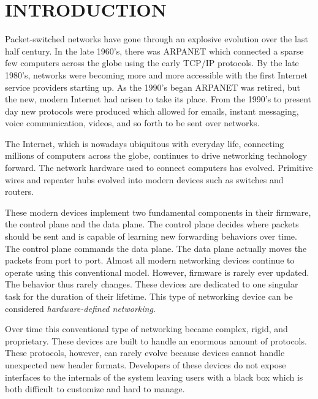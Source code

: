 \chapter{INTRODUCTION} \label{ch:intro}

%
%




Packet-switched networks have gone through an explosive evolution over the last half century. In the late 1960's, there was ARPANET which connected a sparse few computers across the globe using the early TCP/IP protocols. By the late 1980's, networks were becoming more and more accessible with the first Internet service providers starting up. As the 1990's began ARPANET was retired, but the new, modern Internet had arisen to take its place. From the 1990's to present day new protocols were produced which allowed for emails, instant messaging, voice communication, videos, and so forth to be sent over networks. 

The Internet, which is nowadays ubiquitous with everyday life, connecting millions of computers across the globe, continues to drive networking technology forward. The network hardware used to connect computers has evolved. Primitive wires and repeater hubs evolved into modern devices such as switches and routers.

These modern devices implement two fundamental components in their firmware, the control plane and the data plane. The control plane decides where packets should be sent and is capable of learning new forwarding behaviors over time. The control plane commands the data plane. The data plane actually moves the packets from port to port. Almost all modern networking devices continue to operate using this conventional model. However, firmware is rarely ever updated. The behavior thus rarely changes. These devices are dedicated to one singular task for the duration of their lifetime. This type of networking device can be considered \emph{hardware-defined networking}.

Over time this conventional type of networking became complex, rigid, and proprietary. These devices are built to handle an enormous amount of protocols. These protocols, however, can rarely evolve because devices cannot handle unexpected new header formats. Developers of these devices do not expose interfaces to the internals of the system leaving users with a black box which is both difficult to customize and hard to manage.

